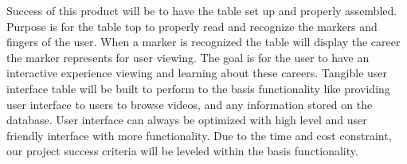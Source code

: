 Success of this product will be to have the table set up and properly assembled. Purpose is for the table top to properly read and recognize the markers and fingers of the user. When a marker is recognized the table will display the career the marker represents for user viewing. The goal is for the user to have an interactive experience viewing and learning about these careers. 
Tangible user interface table will be built to perform to the basis functionality like providing user interface to users to browse videos, and any information stored on the database. User interface can always be optimized with high level and user friendly interface with more functionality. Due to the time and cost constraint, our project success criteria will be leveled within the basis functionality. 
